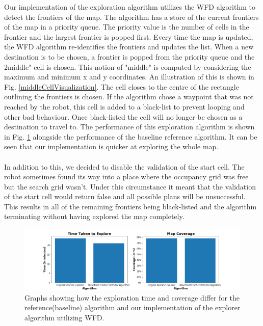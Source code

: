 \documentclass[a4paper,12pt]{article}
\begin{document}
				Our implementation of the exploration algorithm utilizes the WFD algorithm to detect the frontiers of the map. The algorithm has a store of the current frontiers of the map in a priority queue. The priority value is the number of cells in the frontier and the largest frontier is popped first. Every time the map is updated, the WFD algorithm re-identifies the frontiers and updates the list. When a new destination is to be chosen, a frontier is popped from the priority queue and the 2middle" cell is chosen. This notion of "middle" is computed by considering the maximum and minimum x and y coordinates. An illustration of this is shown in Fig. \ref{middleCellVisualization}. The cell closes to the centre of the rectangle outlining the frontiers is chosen. If the algorithm chose a waypoint that was not reached by the robot, this cell is added to a black-list to prevent looping and other bad behaviour. Once black-listed the cell will no longer be chosen as a destination to travel to. The performance of this exploration algorithm is shown in Fig. \ref{Part2} alongside the performance of the baseline reference algorithm. It can be seen that our implementation is quicker at exploring the whole map. 
				\\
				\\
				In addition to this, we decided to disable the validation of the start cell. The robot sometimes found its way into a place where the occupancy grid was free but the search grid wasn't. Under this circumstance it meant that the validation of the start cell would return false and all possible plans will be unsuccessful. This results in all of the remaining frontiers being black-listed and the algorithm terminating without having explored the map completely. 

				\begin{figure}[H]
					\centering
					\includegraphics[scale=0.5]{images/Part2.png}
					\caption{Graphs showing how the exploration time and coverage differ for the reference(baseline) algorithm and our implementation of the explorer algorithm utilizing WFD.}
					\label{Part2}
				\end{figure}
\end{document}
